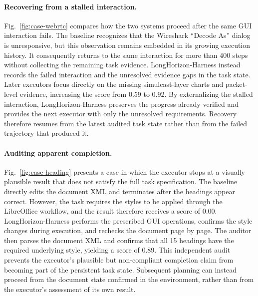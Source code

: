 \paragraph{Recovering from a stalled interaction.}
Fig.~\ref{fig:case-webrtc} compares how the two systems proceed after
the same GUI interaction fails. The baseline recognizes that the
Wireshark ``Decode As'' dialog is unresponsive, but this observation
remains embedded in its growing execution history. It consequently
returns to the same interaction for more than 400 steps without
collecting the remaining task evidence. LongHorizon-Harness instead
records the failed interaction and the unresolved evidence gaps in the
task state. Later executors focus directly on the missing
simulcast-layer charts and packet-level evidence, increasing the score
from 0.59 to 0.92. By externalizing the stalled interaction,
LongHorizon-Harness preserves the progress already verified and
provides the next executor with only the unresolved requirements.
Recovery therefore resumes from the latest audited task state rather
than from the failed trajectory that produced it.


\paragraph{Auditing apparent completion.}
Fig.~\ref{fig:case-heading} presents a case in which the executor stops
at a visually plausible result that does not satisfy the full task
specification. The baseline directly edits the document XML and
terminates after the headings appear correct. However, the task
requires the styles to be applied through the LibreOffice workflow,
and the result therefore receives a score of 0.00.
LongHorizon-Harness performs the prescribed GUI operations, confirms
the style changes during execution, and rechecks the document page by
page. The auditor then parses the document XML and confirms that all
15 headings have the required underlying style, yielding a score of
0.89. This independent audit prevents the executor's plausible but
non-compliant completion claim from becoming part of the persistent
task state. Subsequent planning can instead proceed from the document
state confirmed in the environment, rather than from the executor's
assessment of its own result.


